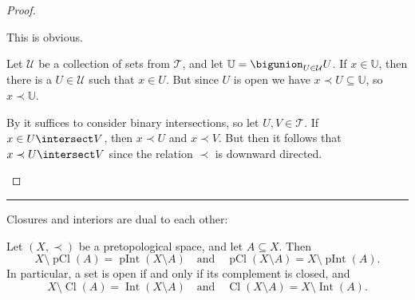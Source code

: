 \documentclass[article, a4paper, 11pt, oneside]{memoir}
\numberwithin{equation}{chapter}
\newcommand{\calT}{\mathcal{T}}
\newcommand{\calU}{\mathcal{U}}
\newcommand{\inpoint}{\prec}
\newcommand{\pInt}[1]{\operatorname{pInt}(#1)}
\newcommand{\pCl}[1]{\operatorname{pCl}(#1)}
\renewcommand{\interior}[1]{\operatorname{Int}(#1)}
\renewcommand{\closure}[1]{\operatorname{Cl}(#1)}
\newcommand\fleuronbreak{\fancybreak{\textcolor{linkcolor}{\adfhangingflatleafleft}}}
\begin{document}
\newcommand{\bbU}{\mathbb{U}}

\begin{proof}
\begin{proofsec}
    \item[Proof of \subcref{enum:topology-emptyset+X}]
    This is obvious.
    
    \item[Proof of \subcref{enum:topology-unions}]
    Let $\calU$ be a collection of sets from $\calT$, and let $\bbU = \bigunion_{U \in \calU} U$. If $x \in \bbU$, then there is a $U \in \calU$ such that $x \in U$. But since $U$ is open we have $x \inpoint U \subseteq \bbU$, so $x \inpoint \bbU$.

    \item[Proof of \subcref{enum:topology-intersections}]
    By  it suffices to consider binary intersections, so let $U,V \in \calT$. If $x \in U \intersect V$, then $x \inpoint U$ and $x \inpoint V$. But then it follows that $x \inpoint U \intersect V$ since the relation $\inpoint$ is downward directed.
\end{proofsec}
\end{proof}

\fleuronbreak

Closures and interiors are dual to each other:
%
\begin{proposition}
    \label{thm:closure-interior-duality}
    Let $(X,\inpoint)$ be a pretopological space, and let $A \subseteq X$. Then
    \begin{equation*}
        X \setminus \pCl{A} = \pInt{X \setminus A}
        \quad \text{and} \quad
        \pCl{X \setminus A} = X \setminus \pInt{A}.
    \end{equation*}
    In particular, a set is open if and only if its complement is closed, and
    \begin{equation*}
        X \setminus \closure{A} = \interior{X \setminus A}
        \quad \text{and} \quad
        \closure{X \setminus A} = X \setminus \interior{A}.
    \end{equation*}
\end{proposition}
\end{document}
